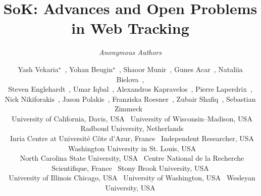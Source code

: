 \documentclass[letterpaper,twocolumn,10pt]{article}
\begin{document}

\date{}

\title{\Large \bf SoK: Advances and Open Problems in Web Tracking}

\ifanonymous
\author{\em Anonymous Authors}
\else
\author{
{\rm Yash Vekaria$^\star$~\ucDavis{}}, 
{\rm Yohan Beugin$^\star$~\uwMadison{}}, 
{\rm Shaoor Munir~\ucDavis{}}, 
{\rm Gunes Acar~\radboud{}}, 
{\rm Nataliia Bielova~\inria{}}, \\
{\rm Steven Englehardt~\independent{}}, 
{\rm Umar Iqbal~\washU{}},
{\rm Alexandros Kapravelos~\ncstate{}},   
{\rm Pierre Laperdrix~\cnrs{}},\\
{\rm Nick Nikiforakis~\stonybrook{}},
{\rm Jason Polakis~\uic{}},
{\rm Franziska Roesner~\uwashington{}},
{\rm Zubair Shafiq~\ucDavis{}}, 
{\rm Sebastian Zimmeck~\wu{}}\\
%
\ucDavis{}~\small{University of California, Davis, USA}\hfill{}
\uwMadison{}~\small{University of Wisconsin–Madison, USA}\hfill{}
\radboud{}~\small{Radboud University, Netherlands}\\
\inria{}~\small{Inria Centre at Université Côte d’Azur, France}\hfill{}
\independent{}~\small{Independent Researcher, USA}\hfill{}
\washU{}~\small{Washington University in St. Louis, USA}\\
\ncstate{}~\small{North Carolina State University, USA}\hfill{}
\cnrs{}~\small{Centre National de la Recherche Scientifique, France}\hfill{}
\stonybrook{}~\small{Stony Brook University, USA}\\
\uic{}~\small{University of Illinois Chicago, USA}\hfill{}
\uwashington{}~\small{University of Washington, USA}\hfill{}
\wu{}~\small{Wesleyan University, USA}
}
\fi
\end{document}
